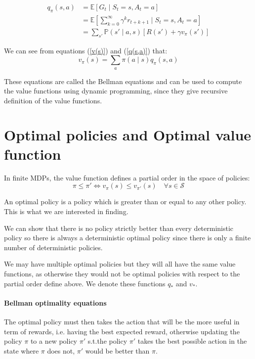 \documentclass[14pt,a4paper]{article}
\def\iff{\Leftrightarrow}
\theoremstyle{definition}
\begin{document}
\begin{equation}
\begin{split}
q_{\pi}(s,a)&= \mathbb{E}\left[G_t\mid S_t=s, A_t=a\right]
\\&=\mathbb{E}\left[\sum_{k=0}^{\infty}\gamma^{k}r_{t+k+1}\mid S_t=s,A_t=a\right]
\\&= \sum_{s'}\mathbb{P}(s'\mid a,s)\left[R(s')+\gamma v_{\pi}(s')\right]
\end{split}
\label{q(s,a)}
\end{equation}



We can see from equations (\ref{v(s)}) and (\ref{q(s,a)})  that: 
\begin{equation}
v_{\pi}(s)=\sum_{a}\pi(a\mid s)q_{\pi}(s,a)
\end{equation}

These equations are called the Bellman equations and can be used to compute the value functions using dynamic programming, since they give recursive definition of the value functions.




\section{Optimal policies and Optimal value function}

In finite MDPs, the value function defines a partial order in the space of policies: 
$$ 
\pi\leq \pi' \iff v_{\pi} (s)\leq v_{\pi'} (s) \quad \forall s \in \mathcal{S}
$$

An optimal policy is a policy which is greater than or equal to any other policy. This is what we are interested in finding.

We can show that there is no policy strictly better than every deterministic policy \citep{Puterman} so there is always a deterministic optimal policy since there is only a finite number of deterministic policies.


We may have multiple optimal policies but they will all have the same value functions, as otherwise they would not be optimal policies with respect to the partial order define above. We denote these functions $q_{*}$ and $v_{*}$.

\paragraph{Bellman optimality equations}

The optimal policy must then takes the action that will be the more useful in term of rewards, i.e. having the best expected reward, otherwise updating the policy $\pi$ to a new policy $\pi'$ s.t.the policy $\pi'$ takes the best possible action in the state where $\pi$ does not, $\pi'$ would be better than $\pi$.
\end{document}
